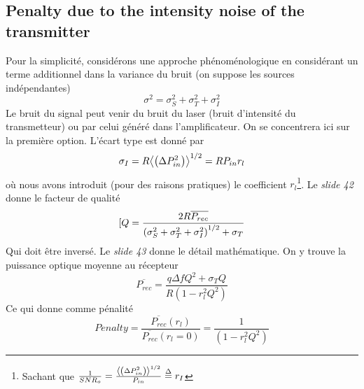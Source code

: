 \subsection{Penalty due to the intensity noise of the transmitter}
Pour la simplicité, considérons une approche phénoménologique en considérant un terme additionnel
dans la variance du bruit (on suppose les sources indépendantes)
\begin{equation}
{\sigma ^2} = \sigma _S^2 + \sigma _T^2 + \sigma _I^2
\end{equation}
Le bruit du signal peut venir du bruit du laser (bruit d'intensité du transmetteur) ou par celui
généré dans l'amplificateur. On se concentrera ici sur la première option. L'écart type est donné
par
\begin{equation}
{\sigma _I} = R{\left\langle {\left( {\Delta P_{in}^2} \right)} \right\rangle ^{{1 \mathord{\left/
 {\vphantom {1 2}} \right.
 \kern-\nulldelimiterspace} 2}}} = R{P_{in}}{r_l}
\end{equation}
où nous avons introduit (pour des raisons pratiques) le coefficient $r_l$\footnote{Sachant que $\frac{1}{{SN{R_o}}} = \frac{{{{\left\langle {\left( {\Delta P_{in}^2} \right)} \right\rangle }^{{1 \mathord{\left/
 {\vphantom {1 2}} \right.
 \kern-\nulldelimiterspace} 2}}}}}{{{P_{in}}}} \buildrel \Delta \over = {r_I}$}. Le \textit{slide 42}
 donne le facteur de qualité
 \begin{equation}
[Q = \frac{{2R\overline {{P_{rec}}} }}{{{{\left( {\sigma _S^2 + \sigma _T^2 + \sigma _I^2} \right)}^{{1 \mathord{\left/
 {\vphantom {1 2}} \right.
 \kern-\nulldelimiterspace} 2}}} + {\sigma _T}}}
 \end{equation}
Qui doit être inversé. Le \textit{slide 43} donne le détail mathématique. On y trouve la puissance
optique moyenne au récepteur
\begin{equation}
\overline {{P_{rec}}}  = \frac{{q\Delta f{Q^2} + {\sigma _T}Q}}{{R\left( {1 - r_l^2{Q^2}} \right)}}
\end{equation}
Ce qui donne comme pénalité
\begin{equation}
Penalty = \frac{{\overline {{P_{rec}}} \left( {{r_l}} \right)}}{{\overline {{P_{rec}}} \left( {{r_l} = 0} \right)}} = \frac{1}{{\left( {1 - r_l^2{Q^2}} \right)}}
\end{equation}

